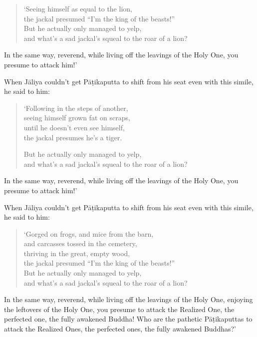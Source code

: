 \documentclass[12pt,openany]{book}%
\begin{document}
\begin{verse}%
‘Seeing himself as equal to the lion, \\
the jackal presumed “I’m the king of the beasts!” \\
But he actually only managed to yelp, \\
and what’s a sad jackal’s squeal to the roar of a lion? 

%
\end{verse}

In the same way, reverend, while living off the leavings of the Holy One, you presume to attack him!’ 

When \textsanskrit{Jāliya} couldn’t get \textsanskrit{Pāṭikaputta} to shift from his seat even with this simile, he said to him: 

\begin{verse}%
‘Following in the steps of another, \\
seeing himself grown fat on scraps, \\
until he doesn’t even see himself, \\
the jackal presumes he’s a tiger. 

But he actually only managed to yelp, \\
and what’s a sad jackal’s squeal to the roar of a lion? 

%
\end{verse}

In the same way, reverend, while living off the leavings of the Holy One, you presume to attack him!’ 

When \textsanskrit{Jāliya} couldn’t get \textsanskrit{Pāṭikaputta} to shift from his seat even with this simile, he said to him: 

\begin{verse}%
‘Gorged on frogs, and mice from the barn, \\
and carcasses tossed in the cemetery, \\
thriving in the great, empty wood, \\
the jackal presumed “I’m the king of the beasts!” \\
But he actually only managed to yelp, \\
and what’s a sad jackal’s squeal to the roar of a lion? 

%
\end{verse}

In the same way, reverend, while living off the leavings of the Holy One, enjoying the leftovers of the Holy One, you presume to attack the Realized One, the perfected one, the fully awakened Buddha! Who are the pathetic \textsanskrit{Pāṭikaputtas} to attack the Realized Ones, the perfected ones, the fully awakened Buddhas?’ 
\end{document}

